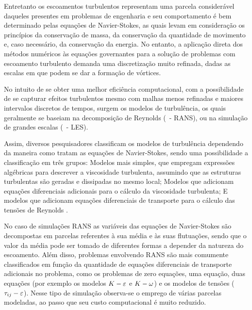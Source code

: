 Entretanto os escoamentos turbulentos representam uma parcela considerável daqueles presentes em problemas de engenharia e seu comportamento é bem determinado pelas equações de Navier-Stokes, as quais levam em consideração os princípios da conservação de massa, da conservação da quantidade de movimento e, caso necessário, da conservação da energia. No entanto, a aplicação direta dos métodos numéricos às equações governantes para a solução de problemas com escoamento turbulento demanda uma discretização muito refinada, dadas as escalas em que podem se dar a formação de vórtices.



No intuito de se obter uma melhor eficiência computacional, com a possibilidade de se capturar efeitos turbulentos mesmo com malhas menos refinadas e maiores intervalos discretos de tempos, surgem os modelos de turbulência, os quais geralmente se baseiam na decomposição de Reynolds (\RANS\ - RANS), ou na simulação de grandes escalas (\LES\ - LES).

Assim, diversos pesquisadores classificam os modelos de turbulência dependendo da maneira como tratam as equações de Navier-Stokes, sendo uma possibilidade a classificação em três grupos: Modelos mais simples, que empregam expressões algébricas para descrever a viscosidade turbulenta, assumindo que as estruturas turbulentas são geradas e dissipadas no mesmo local; Modelos que adicionam equações diferenciais adicionais para o cálculo da viscosidade turbulenta; E modelos que adicionam equações diferenciais de transporte para o cálculo das tensões de Reynolds \cite{souza2011revisao,alfonsi2009reynolds,teixeira2001simulaccao}.

No caso de simulações RANS as variáveis das equações de Navier-Stokes são decompostas em parcelas referentes à sua média e às suas flutuações, sendo que o valor da média pode ser tomado de diferentes formas a depender da natureza do escoamento. Além disso, problemas envolvendo RANS são mais comumente classificados em função da quantidade de equações diferenciais de transporte adicionais no problema, como os problemas de zero equações, uma equação, duas equações (por exemplo os modelos $K-\varepsilon$ e $K-\omega$) e os modelos de tensões ($\tau_{ij}-\varepsilon$). Nesse tipo de simulação observa-se o emprego de várias parcelas modeladas, ao passo que seu custo computacional é muito reduzido.

